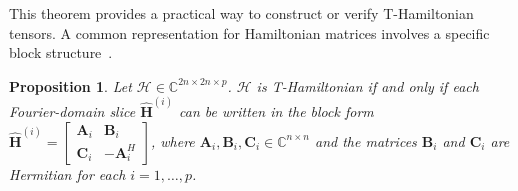 \documentclass[pdflatex,sn-mathphys-ay]{sn-jnl}
\newcommand{\T}[1]{\mathcal{#1}}    %
\newcommand{\M}[1]{\bm{#1}}     %
\newcommand{\C}{\mathbb{C}}         %
\theoremstyle{thmstyleone}
\newtheorem{proposition}[theorem]{Proposition}
\theoremstyle{thmstyletwo}
\theoremstyle{thmstylethree}
\numberwithin{equation}{section}
\begin{document}
This theorem provides a practical way to construct or verify T-Hamiltonian tensors. 
A common representation for Hamiltonian matrices involves a specific block structure~\cite{benner2001symplectic}.

\begin{proposition}
\label{prop:T-Hamiltonian}
Let $\T{H} \in \C^{2n \times 2n \times p}$. 
$\T{H}$ is T-Hamiltonian if and only if each Fourier-domain slice $\widehat{\M{H}}^{(i)}$ can be written in the block form $\widehat{\M{H}}^{(i)} = \begin{bmatrix} \M{A}_i & \M{B}_i \\ \M{C}_i & -\M{A}_i^H \end{bmatrix}$, where $\M{A}_i, \M{B}_i, \M{C}_i \in \C^{n \times n}$ and the matrices $\M{B}_i$ and $\M{C}_i$ are Hermitian for each $i=1, \dots, p$.
\end{proposition}
\end{document}
